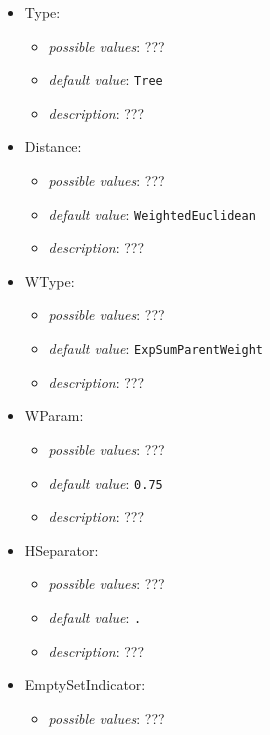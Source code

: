 \documentclass{article}
\begin{document}
\begin{itemize}
    \item Type:
           \begin{itemize}
                \item \emph{possible values}: ???
                \item \emph{default value}: \texttt{Tree}
                \item \emph{description}: ???
           \end{itemize}
    \item Distance:
           \begin{itemize}
                \item \emph{possible values}: ???
                \item \emph{default value}: \texttt{WeightedEuclidean}
                \item \emph{description}: ???
           \end{itemize}
    \item WType:
           \begin{itemize}
                \item \emph{possible values}: ???
                \item \emph{default value}: \texttt{ExpSumParentWeight}
                \item \emph{description}: ???
           \end{itemize}
    \item WParam:
           \begin{itemize}
                \item \emph{possible values}: ???
                \item \emph{default value}: \texttt{0.75}
                \item \emph{description}: ???
           \end{itemize}
    \item HSeparator:
           \begin{itemize}
                \item \emph{possible values}: ???
                \item \emph{default value}: \texttt{.}
                \item \emph{description}: ???
           \end{itemize}
    \item EmptySetIndicator:
           \begin{itemize}
                \item \emph{possible values}: ???

\end{itemize}
\end{itemize}
\end{document}
